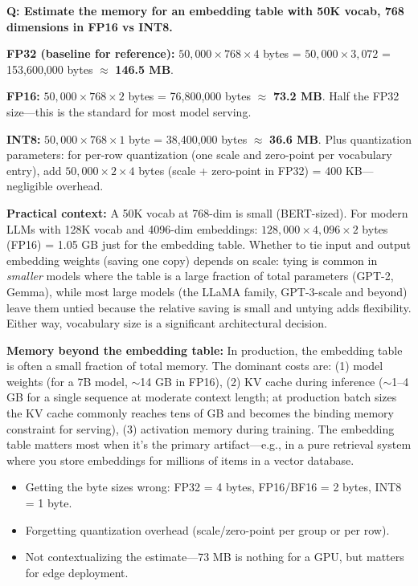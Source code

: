 \begin{interviewq}
\textbf{Q: Estimate the memory for an embedding table with 50K vocab, 768 dimensions in FP16 vs INT8.}

 \quad {} \quad \badgefreq{\freqmed}

\stronganswer

\textbf{FP32 (baseline for reference):} $50{,}000 \times 768 \times 4$ bytes = $50{,}000 \times 3{,}072$ = 153,600,000 bytes $\approx$ \textbf{146.5 MB}.

\textbf{FP16:} $50{,}000 \times 768 \times 2$ bytes = 76,800,000 bytes $\approx$ \textbf{73.2 MB}. Half the FP32 size---this is the standard for most model serving.

\textbf{INT8:} $50{,}000 \times 768 \times 1$ byte = 38,400,000 bytes $\approx$ \textbf{36.6 MB}. Plus quantization parameters: for per-row quantization (one scale and zero-point per vocabulary entry), add $50{,}000 \times 2 \times 4$ bytes (scale + zero-point in FP32) = 400 KB---negligible overhead.

\textbf{Practical context:} A 50K vocab at 768-dim is small (BERT-sized). For modern LLMs with 128K vocab and 4096-dim embeddings: $128{,}000 \times 4{,}096 \times 2$ bytes (FP16) = 1.05 GB just for the embedding table. Whether to tie input and output embedding weights (saving one copy) depends on scale: tying is common in \textit{smaller} models where the table is a large fraction of total parameters (GPT-2, Gemma), while most large models (the LLaMA family, GPT-3-scale and beyond) leave them untied because the relative saving is small and untying adds flexibility. Either way, vocabulary size is a significant architectural decision.

\textbf{Memory beyond the embedding table:} In production, the embedding table is often a small fraction of total memory. The dominant costs are: (1) model weights (for a 7B model, $\sim$14 GB in FP16), (2) KV cache during inference ($\sim$1--4 GB for a single sequence at moderate context length; at production batch sizes the KV cache commonly reaches tens of GB and becomes the binding memory constraint for serving), (3) activation memory during training. The embedding table matters most when it's the primary artifact---e.g., in a pure retrieval system where you store embeddings for millions of items in a vector database.

\redflags
\begin{itemize}
    \item Getting the byte sizes wrong: FP32 = 4 bytes, FP16/BF16 = 2 bytes, INT8 = 1 byte.
    \item Forgetting quantization overhead (scale/zero-point per group or per row).
    \item Not contextualizing the estimate---73 MB is nothing for a GPU, but matters for edge deployment.
\end{itemize}


\end{interviewq}
